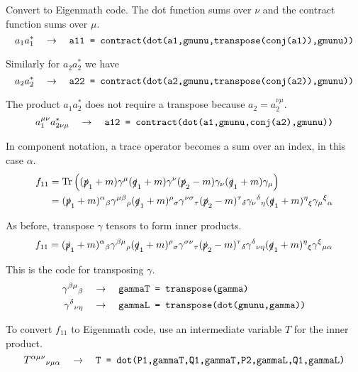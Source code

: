 \documentclass[12pt]{article}
\begin{document}
Convert to Eigenmath code.
The dot function sums over $\nu$ and the contract function sums over $\mu$.
\begin{equation*}
a_1a_1^*
\quad\rightarrow\quad
\text{\tt a11 = contract(dot(a1,gmunu,transpose(conj(a1)),gmunu))}
\end{equation*}

Similarly for $a_2a_2^*$ we have
\begin{equation*}
a_2a_2^*
\quad\rightarrow\quad
\text{\tt a22 = contract(dot(a2,gmunu,transpose(conj(a2)),gmunu))}
\end{equation*}

The product $a_1a_2^*$ does not require a transpose because $a_2=a_2^{\nu\mu}$.
\begin{equation*}
a_1^{\mu\nu}a_{2\nu\mu}^*
\quad\rightarrow\quad
\text{\tt a12 = contract(dot(a1,gmunu,conj(a2),gmunu))}
\end{equation*}

In component notation, a trace operator becomes a sum over an index, in this case $\alpha$.
\begin{align*}
f_{11}
&=
\mathop{\rm Tr}
\left(
(\slashed{p}_1+m)\gamma^\mu(\slashed{q}_1+m)\gamma^\nu(\slashed{p}_2-m)\gamma_\nu(\slashed{q}_1+m)\gamma_\mu
\right)\\
&=
(\slashed{p}_1+m)^\alpha{}_\beta
\gamma^{\mu\beta}{}_\rho
(\slashed{q}_1+m)^\rho{}_\sigma
\gamma^{\nu\sigma}{}_\tau
(\slashed{p}_2-m)^\tau{}_\delta
\gamma_\nu{}^\delta{}_\eta
(\slashed{q}_1+m)^\eta{}_\xi
\gamma_\mu{}^\xi{}_\alpha
\end{align*}

As before, transpose $\gamma$ tensors to form inner products.
\begin{equation*}
f_{11}=
(\slashed{p}_1+m)^\alpha{}_\beta
\gamma^{\beta\mu}{}_\rho
(\slashed{q}_1+m)^\rho{}_\sigma
\gamma^{\sigma\nu}{}_\tau
(\slashed{p}_2-m)^\tau{}_\delta
\gamma^\delta{}_{\nu\eta}
(\slashed{q}_1+m)^\eta{}_\xi
\gamma^\xi{}_{\mu\alpha}
\end{equation*}

This is the code for transposing $\gamma$.
\begin{align*}
\gamma^{\beta\mu}{}_\beta
&\quad\rightarrow\quad
\text{\tt gammaT = transpose(gamma)}
\\
\gamma^\delta{}_{\nu\eta}
&\quad\rightarrow\quad
\text{\tt gammaL = transpose(dot(gmunu,gamma))}
\end{align*}

To convert $f_{11}$ to Eigenmath code, use an intermediate variable $T$ for the inner product.
\begin{equation*}
T^{\alpha\mu\nu}{}_{\nu\mu\alpha}
\quad\rightarrow\quad
\text{\tt T = dot(P1,gammaT,Q1,gammaT,P2,gammaL,Q1,gammaL)}
\end{equation*}
\end{document}
